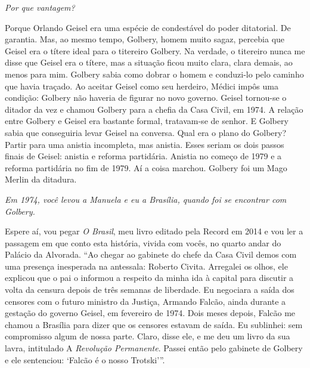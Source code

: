 \itshape
 Por que vantagem?

\normalfont 
Porque Orlando Geisel era uma espécie de condestável do
poder ditatorial. De garantia. Mas, ao mesmo tempo, Golbery, homem muito
sagaz, percebia que Geisel era o títere ideal para o titereiro Golbery.
Na verdade, o titereiro nunca me disse que Geisel era o títere, mas a
situação ficou muito clara, clara demais, ao menos para mim. Golbery
sabia como dobrar o homem e conduzi-lo pelo caminho que havia traçado.
Ao aceitar Geisel como seu herdeiro, Médici impôs uma condição: Golbery
não haveria de figurar no novo governo. Geisel tornou-se o ditador da
vez e chamou Golbery para a chefia da Casa Civil, em 1974. A relação
entre Golbery e Geisel era bastante formal, tratavam-se de senhor. E
Golbery sabia que conseguiria levar Geisel na conversa. Qual era o plano
do Golbery? Partir para uma anistia incompleta, mas anistia. Esses
seriam os dois passos finais de Geisel: anistia e reforma partidária.
Anistia no começo de 1979 e a reforma partidária no fim de 1979. Aí a
coisa marchou. Golbery foi um Mago Merlin da ditadura.

\itshape
 Em 1974, você levou a Manuela e eu a Brasília, quando
foi se encontrar com Golbery.

\normalfont 
Espere aí, vou pegar \emph{O Brasil}, meu livro editado
pela Record em 2014 e vou ler a passagem em que conto esta história,
vivida com vocês, no quarto andar do Palácio da Alvorada. ``Ao chegar ao
gabinete do chefe da Casa Civil demos com uma presença inesperada na
antessala: Roberto Civita. Arregalei os olhos, ele explicou que o pai o
informou a respeito da minha ida à capital para discutir a volta da
censura depois de três semanas de liberdade. Eu negociara a saída dos
censores com o futuro ministro da Justiça, Armando Falcão, ainda durante
a gestação do governo Geisel, em fevereiro de 1974. Dois meses depois,
Falcão me chamou a Brasília para dizer que os censores estavam de saída.
Eu sublinhei: sem compromisso algum de nossa parte. Claro, disse ele, e
me deu um livro da sua lavra, intitulado A \emph{Revolução Permanente}.
Passei então pelo gabinete de Golbery e ele sentenciou: `Falcão é o
nosso Trotski'''.

